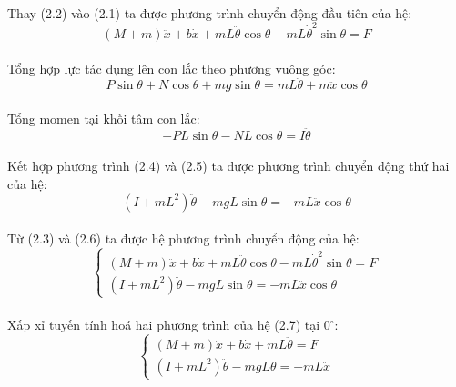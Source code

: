 \paragraph{}Thay (2.2) vào (2.1) ta được phương trình chuyển động đầu tiên của hệ:
\begin{equation}
(M + m)\ddot{x} + b\dot{x} + mL\ddot{\theta}\cos{\theta} - mL\dot{\theta}^{2}\sin{\theta} = F
\end{equation}
\paragraph{}Tổng hợp lực tác dụng lên con lắc theo phương vuông góc:
\begin{equation}
P\sin{\theta} + N\cos{\theta} + mg\sin{\theta} = mL\ddot{\theta} + m\ddot{x}\cos{\theta}
\end{equation}
\paragraph{}Tổng momen tại khối tâm con lắc: 
\begin{equation}
-PL\sin{\theta} - NL\cos{\theta} = I\ddot{\theta}
\end{equation}
\paragraph{}Kết hợp phương trình (2.4) và (2.5) ta được phương trình chuyển động thứ hai của hệ: 
\begin{equation}
(I + mL^{2})\ddot{\theta} - mgL\sin{\theta} = - mL\ddot{x}\cos{\theta}
\end{equation}
\paragraph{}Từ (2.3) và (2.6) ta được hệ phương trình chuyển động của hệ:
\begin{equation}
\begin{cases}
(M + m)\ddot{x} + b\dot{x} + mL\ddot{\theta}\cos{\theta} - mL\dot{\theta}^{2}\sin{\theta} = F \\
(I + mL^{2})\ddot{\theta} - mgL\sin{\theta} = - mL\ddot{x}\cos{\theta}
\end{cases}
\end{equation}
\paragraph{}Xấp xỉ tuyến tính hoá hai phương trình của hệ (2.7) tại 0${^\circ}$:
\begin{equation}
\begin{cases}
(M + m)\ddot{x} + b\dot{x} + mL\ddot{\theta} = F  \\
(I + mL^{2})\ddot{\theta} - mgL\theta = - mL\ddot{x}
\end{cases}
\end{equation}
